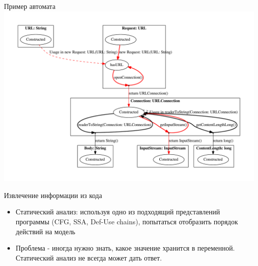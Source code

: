 \documentclass[12pt]{beamer}
\begin{document}
\begin{frame}{Пример автомата}
	\includegraphics[width=\textwidth]{extracted_java.pdf}
\end{frame}

{
\begin{frame}[fragile]{Извлечение информации из кода}
  \begin{mybox}[]
  \begin{itemize}
  	\item Статический анализ: используя одно из подходящий представлений программы (CFG, SSA, Def-Use chains), попытаться отобразить порядок действий на модель
  	\item Проблема - иногда нужно знать, какое значение хранится в переменной. Статический анализ не всегда может дать ответ.
  \end{itemize}
  \end{mybox}
\end{frame}
}
\end{document}
